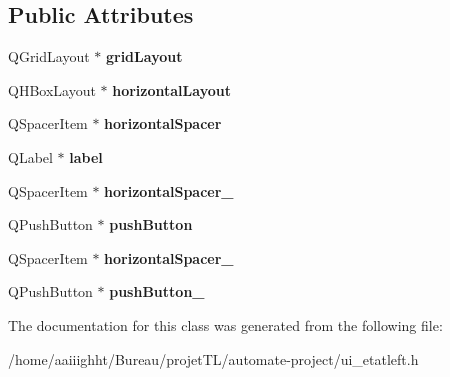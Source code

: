 \subsection*{Public Attributes}
\begin{DoxyCompactItemize}
\item 
\hypertarget{class_ui__etat_left_abdb65fbe4b8a0f34295e0d5728652ba5}{Q\-Grid\-Layout $\ast$ {\bfseries grid\-Layout}}\label{class_ui__etat_left_abdb65fbe4b8a0f34295e0d5728652ba5}

\item 
\hypertarget{class_ui__etat_left_a300042ffdac7e601e030ae1b07ccf57a}{Q\-H\-Box\-Layout $\ast$ {\bfseries horizontal\-Layout}}\label{class_ui__etat_left_a300042ffdac7e601e030ae1b07ccf57a}

\item 
\hypertarget{class_ui__etat_left_ab7fbdab97d16b32874129cd6d351c9a6}{Q\-Spacer\-Item $\ast$ {\bfseries horizontal\-Spacer}}\label{class_ui__etat_left_ab7fbdab97d16b32874129cd6d351c9a6}

\item 
\hypertarget{class_ui__etat_left_ad9c7028ff8988957b3dd08c5be6e6055}{Q\-Label $\ast$ {\bfseries label}}\label{class_ui__etat_left_ad9c7028ff8988957b3dd08c5be6e6055}

\item 
\hypertarget{class_ui__etat_left_a2892338f27837cd4ab7331104cbb38f8}{Q\-Spacer\-Item $\ast$ {\bfseries horizontal\-Spacer\-\_}}\label{class_ui__etat_left_a2892338f27837cd4ab7331104cbb38f8}

\item 
\hypertarget{class_ui__etat_left_aa90b1a7d82f6b1fa53e9fa6b862144a5}{Q\-Push\-Button $\ast$ {\bfseries push\-Button}}\label{class_ui__etat_left_aa90b1a7d82f6b1fa53e9fa6b862144a5}

\item 
\hypertarget{class_ui__etat_left_a885784866cb25c3e4b0f52ab8e53a880}{Q\-Spacer\-Item $\ast$ {\bfseries horizontal\-Spacer\-\_}}\label{class_ui__etat_left_a885784866cb25c3e4b0f52ab8e53a880}

\item 
\hypertarget{class_ui__etat_left_a25daf9503dd346ae8c071c6daa268138}{Q\-Push\-Button $\ast$ {\bfseries push\-Button\-\_}}\label{class_ui__etat_left_a25daf9503dd346ae8c071c6daa268138}

\end{DoxyCompactItemize}


The documentation for this class was generated from the following file\-:\begin{DoxyCompactItemize}
\item 
/home/aaiiighht/\-Bureau/projet\-T\-L/automate-\/project/ui\-\_\-etatleft.\-h\end{DoxyCompactItemize}
